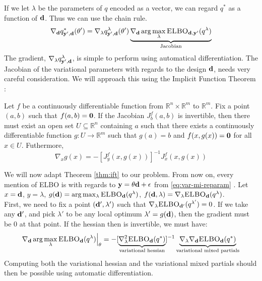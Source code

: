 If we let $\lambda$ be the parameters of $q$ encoded as a vector, we can regard $q^*$ as a function of $\mathbf{d}$.
Thus we can use the chain rule.
\begin{equation}
  \nabla_{\mathbf{d}} q^*_{\mathbf{y}', \mathbf{d}}(\theta') = \nabla_\lambda q^{\lambda}_{\mathbf{y}', \mathbf{d}}(\theta')\underbrace{\nabla_{\mathbf{d}} \arg \max_\lambda \textsc{ELBO}_{\mathbf{d}, \mathbf{y}'}(q^\lambda)}_{\textrm{Jacobian}}
\end{equation}
The gradient, $\nabla_\lambda q^\lambda_{\mathbf{y}',\mathbf{d}}$, is simple to perform using automatical differentiation.
The Jacobian of the variational parameters with regards to the design $\mathbf{d}$, needs very careful consideration. 
We will approach this using the Implicit Function Theorem \cite{lorraine19}:
\begin{theorem}
  Let $f$ be a continuously differentiable function from $\mathbb{R}^n \times \mathbb{R}^m$ to $\mathbb{R}^m$.
  Fix a point $(a, b)$ such that $f(a, b) = \mathbf{0}$. 
  If the Jacobian $J_b^{f}(a, b)$ is invertible, then there must exist an open set $U \subseteq \mathbb{R}^n$ containing $a$
  such that there exists a continuously differentiable function $g: U \rightarrow \mathbb{R}^m$ such that $g(a) = b$ and $f(x, g(x)) = \mathbf{0}$ for all $x \in U$.
  Futhermore,
  $$\nabla_{x}g(x) = -[J_y^f(x, g(x))]^{-1}J_{x}^{f}(x, g(x))$$
  \label{thm:ift}
\end{theorem}
We will now adapt Theorem \ref{thm:ift} to our problem. 
From now on, every mention of ELBO is with regards to $\mathbf{y} = \theta \mathbf{d} + \epsilon$ from \eqref{eq:var-mi-reparam} .
Let $x=\mathbf{d}$, $y=\lambda$, $g(\mathbf{d}) = \arg \max_{\lambda} \textsc{ELBO}_{\mathbf{d}}(q^{\lambda})$, $f(\mathbf{d}, \lambda) = \nabla_{\lambda}\textsc{ELBO}_{\mathbf{d}}(q^{\lambda})$.
\\
First, we need to fix a point $(\mathbf{d}', \lambda')$ such that $\nabla_{\lambda}\textsc{ELBO}_{\mathbf{d}'}(q^{\lambda'}) = 0$.
If we take any $\mathbf{d}'$, and pick $\lambda'$ to be any local optimum $\lambda' = g(\mathbf{d})$, then the gradient must be $0$ at that point.
If the hessian then is invertible, we must have:
\begin{equation}
  \nabla_{\mathbf{d}} \arg \max_{\lambda} \textsc{ELBO}_{\mathbf{d}}(q^{\lambda})\Bigr\rvert_{\theta}= 
  -[\underbrace{\nabla^2_{\lambda} \textsc{ELBO}_{\mathbf{d}}(q^*)}_{\textrm{variational hessian}}]^{-1}
  \underbrace{\nabla_{\lambda}\nabla_{\mathbf{d}}\textsc{ELBO}_{\mathbf{d}}(q^*)}_{\textrm{variational mixed partials}}
  \label{eq:variational-jacobian}
\end{equation}
Computing both the variational hessian and the variational mixed partials should then be possible using automatic differentiation.
